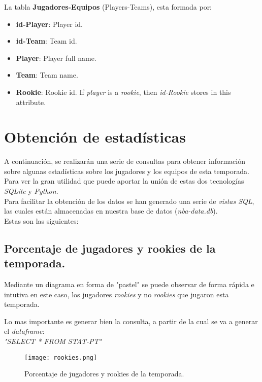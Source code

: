 \documentclass[11pt]{diazessay} %
\begin{document}
La tabla \textbf{Jugadores-Equipos} (Players-Teams), esta formada por:
\begin{itemize}
	\item\textbf{id-Player}: Player id.
	\item\textbf{id-Team}: Team id.
	\item\textbf{Player}: Player full name.
	\item\textbf{Team}: Team name.
	\item\textbf{Rookie}: Rookie id. If \textit{player} is a \textit{rookie}, then \textit{id-Rookie} stores in this attribute.
\end{itemize}

\clearpage

\section{Obtención de estadísticas}
A continuación, se realizarán una serie de consultas para obtener información sobre algunas estadísticas sobre los jugadores y los equipos de esta temporada. Para ver la gran utilidad que puede aportar la unión de estas dos tecnologías \textit{SQLite} y \textit{Python}.\\

Para facilitar la obtención de los datos se han generado una serie de \textit{vistas SQL}, las cuales están almacenadas en nuestra base de datos (\textit{nba-data.db}). \\

Estas son las siguientes:


\subsection{Porcentaje de jugadores y rookies de la temporada.}
Mediante un diagrama en forma de "pastel" se puede observar de forma rápida e intutiva en este caso, los jugadores \textit{rookies} y no \textit{rookies} que jugaron esta temporada.

Lo mas importante es generar bien la consulta, a partir de la cual se va a generar el \textit{dataframe}:\\

\textit{"SELECT * FROM STAT-PT"}

\begin{figure}[!h]
	\centering
	\texttt{[image: rookies.png]}
	\caption{Porcentaje de jugadores y rookies de la temporada.}
	\label{fig:rookies}
\end{figure}
\end{document}
